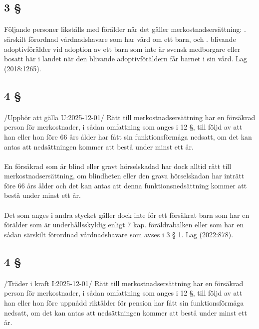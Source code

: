\documentclass[a4paper,notitlepage,openany,10pt]{book}
\begin{document}
\subsection*{3 §}
\paragraph*{}
Följande personer likställs med förälder när det gäller merkostnadsersättning:
. särskilt förordnad vårdnadshavare som har vård om ett barn, och
. blivande adoptivförälder vid adoption av ett barn som inte är svensk medborgare eller bosatt här i landet när den blivande adoptivföräldern får barnet i sin vård.
Lag (2018:1265).
\subsection*{4 §}
\paragraph*{}
/Upphör att gälla U:2025-12-01/
Rätt till merkostnadsersättning har en försäkrad person för merkostnader, i sådan omfattning som anges i 12 §, till följd av att han eller hon före 66 års ålder har fått sin funktionsförmåga nedsatt, om det kan antas att nedsättningen kommer att bestå under minst ett år.
\paragraph*{}
En försäkrad som är blind eller gravt hörselskadad har dock alltid rätt till merkostnadsersättning, om blindheten eller den grava hörselskadan har inträtt före 66 års ålder och det kan antas att denna funktionsnedsättning kommer att bestå under minst ett år.
\paragraph*{}
Det som anges i andra stycket gäller dock inte för ett försäkrat barn som har en förälder som är underhållsskyldig enligt 7 kap. föräldrabalken eller som har en sådan särskilt förordnad vårdnadshavare som avses i 3 § 1.
Lag (2022:878).
\subsection*{4 §}
\paragraph*{}
/Träder i kraft I:2025-12-01/
Rätt till merkostnadsersättning har en försäkrad person för merkostnader, i sådan omfattning som anges i 12 §, till följd av att han eller hon före uppnådd riktålder för pension har fått sin funktionsförmåga nedsatt, om det kan antas att nedsättningen kommer att bestå under minst ett år.
\end{document}
